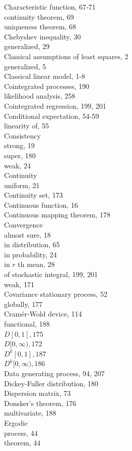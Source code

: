\documentclass[10pt]{article}
\begin{document}
Characteristic function, 67-71\\
continuity theorem, 69\\
uniqueness theorem, 68\\
Chebyshev inequality, 30\\
generalized, 29\\
Classical assumptions of least squares, 2\\
generalized, 5\\
Classical linear model, 1-8\\
Cointegrated processes, 190\\
likelihood analysis, 258\\
Cointegrated regression, 199, 201\\
Conditional expectation, 54-59\\
linearity of, 55\\
Consistency\\
strong, 19\\
super, 180\\
weak, 24\\
Continuity\\
uniform, 21\\
Continuity set, 173\\
Continuous function, 16\\
Continuous mapping theorem, 178\\
Convergence\\
almost sure, 18\\
in distribution, 65\\
in probability, 24\\
in $r$ th mean, 28\\
of stochastic integral, 199, 201\\
weak, 171\\
Covariance stationary process, 52\\
globally, 177\\
Cramér-Wold device, 114\\
functional, 188\\
$D[0,1], 175$\\
$D[0, \infty), 172$\\
$D^{k}[0,1], 187$\\
$D^{k}[0, \infty), 186$\\
Data generating process, 94, 207\\
Dickey-Fuller distribution, 180\\
Dispersion matrix, 73\\
Donsker's theorem, 176\\
multivariate, 188\\
Ergodic\\
process, 44\\
theorem, 44
\end{document}

